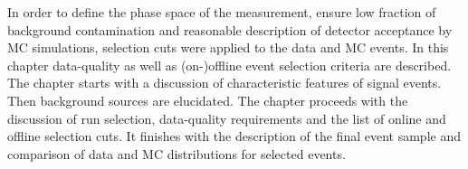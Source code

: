 In order to define the phase space of the measurement, ensure low fraction of background contamination and reasonable description of detector acceptance by MC simulations, selection cuts were applied to the data and MC events. In this chapter data-quality as well as (on-)offline event selection criteria are described. The chapter starts with a discussion of characteristic features of signal events. Then background sources are elucidated. The chapter proceeds with the discussion of run selection, data-quality requirements and the list of online and offline selection cuts. It finishes with the description of the final event sample and comparison of data and MC distributions for selected events.


